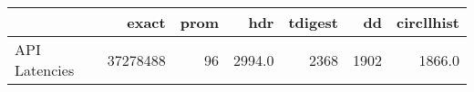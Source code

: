 \begin{tabular}{lrrrrrr}
\toprule
{} &     exact &  prom &     hdr &  tdigest &    dd &  circllhist \\
\midrule
API Latencies &  37278488 &    96 &  2994.0 &     2368 &  1902 &      1866.0 \\
\bottomrule
\end{tabular}
